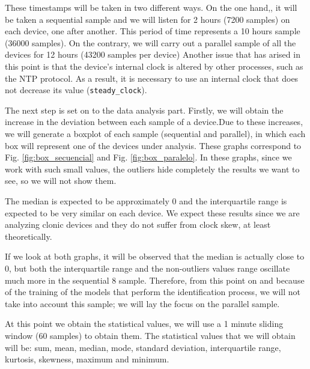 These timestamps will be taken in two different ways. On the one hand,, it will be taken a sequential sample and we will listen for 2 hours (7200 samples) on each device, one after another. This period of time represents a 10 hours sample (36000 samples). On the contrary, we will carry out a parallel sample of all the devices for 12 hours (43200 samples per device) Another issue that has arised in this point is that the device's internal clock is altered by other processes, such as the NTP protocol. As a result, it is necessary to use an internal clock that does not decrease its value (\texttt{steady\_clock}). 


The next step is set on to the data analysis part. Firstly, we will obtain the increase in the deviation between each sample of a device.Due to these increases, we will generate a boxplot of each sample (sequential and parallel), in which each box will represent one of the devices under analysis. These graphs correspond to Fig. \ref{fig:box_secuencial} and Fig. \ref{fig:box_paralelo}. In these graphs, since we work with such small values, the outliers hide completely the results we want to see, so we will not show them. 


The median is expected to be approximately 0 and the interquartile range is expected to be very similar on each device. We expect these results since we are analyzing clonic devices and they do not suffer from clock skew, at least theoretically.


If we look at both graphs, it will be observed that the median is actually close to 0, but both the interquartile range and the non-outliers values range oscillate much more in the sequential 8 sample. Therefore, from this point on and because of the training of the models that perform the identification process, we will not take into account this sample; we will lay the focus on the parallel sample. 


At this point we obtain the statistical values, we will use a 1 minute sliding window (60 samples) to obtain them. The statistical values that we will obtain will be: sum, mean, median, mode, standard deviation, interquartile range, kurtosis, skewness, maximum and minimum.


